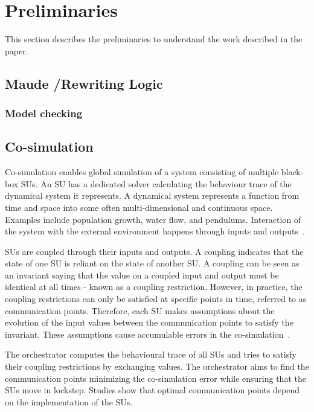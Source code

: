 \section{Preliminaries}\label{sc:background}
This section describes the preliminaries to understand the work described in the paper.

\subsection{Maude /Rewriting Logic}

\subsubsection{Model checking}


\subsection{Co-simulation}
Co-simulation enables global simulation of a system consisting of multiple black-box SUs. 
An SU has a dedicated solver calculating the behaviour trace of the dynamical system it represents. 
A dynamical system represents a function from time and space into some often multi-dimensional and continuous space. 
Examples include population growth, water flow, and pendulums. 
Interaction of the system with the external environment happens through inputs and outputs~\cite{Gomes2019a,Kubler2000}.

SUs are coupled through their inputs and outputs.
A coupling indicates that the state of one SU is reliant on the state of another SU.
A coupling can be seen as an invariant saying that the value on a coupled input and output must be identical at all times - known as a coupling restriction. 
However, in practice, the coupling restrictions can only be satisfied at specific points in time, referred to as communication points. 
Therefore, each SU makes assumptions about the evolution of the input values between the communication points to satisfy the invariant.
These assumptions cause accumulable errors in the co-simulation~\cite{Arnold2014}.

The orchestrator computes the behavioural trace of all SUs and tries to satisfy their coupling restrictions by exchanging values. 
The orchestrator aims to find the communication points minimizing the co-simulation error while ensuring that the SUs move in lockstep. 
Studies \cite{Gomes2019,Oakes2021,Gomes2018f,Schweizer2015c,Gomes2018a} show that optimal communication points depend on the implementation of the SUs.

